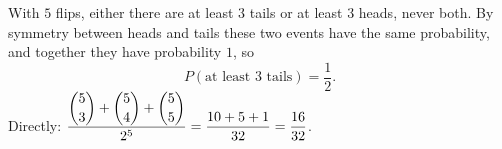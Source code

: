 With $5$ flips, either there are at least $3$ tails or at least $3$ heads, never both. By symmetry between heads and tails these two events have the same probability, and together they have probability $1$, so
\[
P(\text{at least 3 tails})=\boxed{\dfrac{1}{2}}.
\]
Directly: $\dfrac{\dbinom53+\dbinom54+\dbinom55}{2^5}=\dfrac{10+5+1}{32}=\dfrac{16}{32}$.
